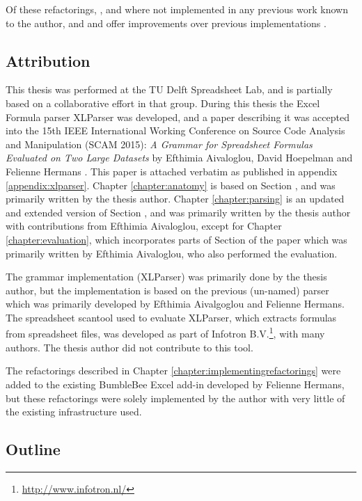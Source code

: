Of these refactorings, ,  and  where not implemented in any previous work known to the author, and  and  offer improvements over previous implementations \cite{badame2012refactoring}.

\newpage

\subsection{Attribution}

This thesis was performed at the TU Delft Spreadsheet Lab, and is partially based on a collaborative effort in that group.
During this thesis the Excel Formula parser XLParser was developed, and a paper describing it was accepted into the 15th IEEE International Working Conference on Source Code Analysis and Manipulation (SCAM 2015): \emph{A Grammar for Spreadsheet Formulas Evaluated on Two Large Datasets} by Efthimia Aivaloglou, David Hoepelman and Felienne Hermans \cite{xlparser}.
This paper is attached verbatim as published in appendix \ref{appendix:xlparser}.
Chapter \ref{chapter:anatomy} is based on Section , and was primarily written by the thesis author.
Chapter \ref{chapter:parsing} is an updated and extended version of Section , and was primarily written by the thesis author with contributions from Efthimia Aivaloglou, except for Chapter \ref{chapter:evaluation}, which incorporates parts of Section  of the paper which was primarily written by Efthimia Aivaloglou, who also performed the evaluation. 

The grammar implementation (XLParser) was primarily done by the thesis author, but the implementation is based on the previous (un-named) parser which was primarily developed by Efthimia Aivalgoglou and Felienne Hermans.
The spreadsheet scantool used to evaluate XLParser, which extracts formulas from spreadsheet files, was developed as part of Infotron B.V.\footnote{\url{http://www.infotron.nl/}}, with many authors. The thesis author did not contribute to this tool.

The refactorings described in Chapter \ref{chapter:implementingrefactorings} were added to the existing BumbleBee Excel add-in developed by Felienne Hermans, but these refactorings were solely implemented by the author with very little of the existing infrastructure used.

\subsection{Outline}

